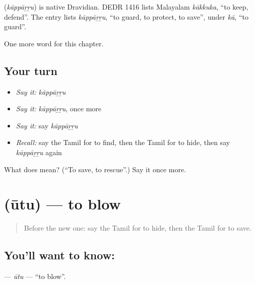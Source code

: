 \begin{cousinweb}
\textbf{} (\emph{kāppāṟṟu}) is native Dravidian. DEDR 1416 lists Malayalam \emph{kākkuka}, \textquotedblleft{}to keep, defend\textquotedblright{}. The entry lists \emph{kāppāṟṟu}, \textquotedblleft{}to guard, to protect, to save\textquotedblright{}, under \emph{kā}, \textquotedblleft{}to guard\textquotedblright{}.
\end{cousinweb}

\begin{grammarlens}[title={What you've built}]
One more word for this chapter.
\end{grammarlens}

\subsection*{Your turn}
\begin{itemize}
\raggedright
  \item \emph{Say it:} \emph{kāppāṟṟu}
  \item \emph{Say it:} \emph{kāppāṟṟu}, once more
  \item \emph{Say it:} say \emph{kāppāṟṟu}
  \item \emph{Recall:} say the Tamil for to find, then the Tamil for to hide, then say \emph{kāppāṟṟu} again
\end{itemize}

\begin{tcolorbox}[breakable,colback=teal!4,colframe=teal!35!black,title={Before you move on}]
What does  mean? (\textquotedblleft{}To save, to rescue\textquotedblright{}.) Say it once more.
\end{tcolorbox}
\section[\texorpdfstring{\ta{ஊது} (ūtu)}{ஊது (ūtu)}]{ (ūtu) — to blow}

\label{lesson:TA-C157-utu}



\begin{quote}
Before the new one: say the Tamil for to hide, then the Tamil for to save.
\end{quote}

\subsection*{You'll want to know: }
\textbf{} — \emph{ūtu} — \textquotedblleft{}to blow\textquotedblright{}.

